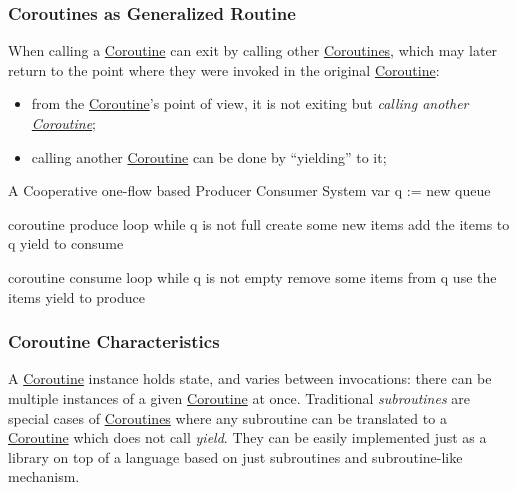 \subsubsection{Coroutines as Generalized Routine}\label{sub:rs_coroutines_as_generalized_routine} %
When calling a \hyperref[sub:rs_co_routines]{Coroutine} can exit by calling other \hyperref[sub:rs_co_routines]{Coroutines}, which may later return to the point where they were invoked in the original \hyperref[sub:rs_co_routines]{Coroutine}:\begin{itemize}
    \item from the \hyperref[sub:rs_co_routines]{Coroutine}'s point of view, it is not exiting but \textit{calling another \hyperref[sub:rs_co_routines]{Coroutine}};
    \item calling another \hyperref[sub:rs_co_routines]{Coroutine} can be done by ``yielding'' to it;
\end{itemize}
\begin{codeblock}[txt]{A Cooperative one-flow based Producer Consumer System}
    var q := new queue

    coroutine produce
        loop
            while q is not full
                create some new items
                add the items to q
            yield to consume

    coroutine consume
        loop
            while q is not empty
                remove some items from q
                use the items
            yield to produce
\end{codeblock}
%
\subsubsection{Coroutine Characteristics}\label{sub:rs_coroutine_characteristics} %
A \hyperref[sub:rs_co_routines]{Coroutine} instance holds state, and varies between invocations: there can be multiple instances of a given \hyperref[sub:rs_co_routines]{Coroutine} at once.
Traditional \textit{subroutines} are special cases of \hyperref[sub:rs_co_routines]{Coroutines} where any subroutine can be translated to a \hyperref[sub:rs_co_routines]{Coroutine} which does not call \textit{yield}.
\emptyln{}
They can be easily implemented just as a library on top of a language based on just subroutines and subroutine-like mechanism.
%
